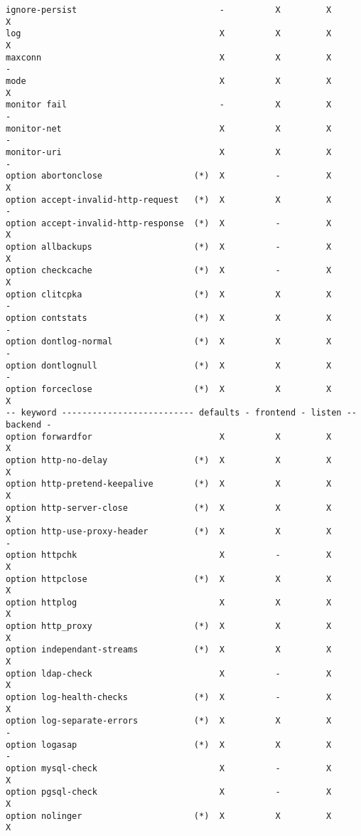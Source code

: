 \begin{verbatim}
ignore-persist                            -          X         X         X
log                                       X          X         X         X
maxconn                                   X          X         X         -
mode                                      X          X         X         X
monitor fail                              -          X         X         -
monitor-net                               X          X         X         -
monitor-uri                               X          X         X         -
option abortonclose                  (*)  X          -         X         X
option accept-invalid-http-request   (*)  X          X         X         -
option accept-invalid-http-response  (*)  X          -         X         X
option allbackups                    (*)  X          -         X         X
option checkcache                    (*)  X          -         X         X
option clitcpka                      (*)  X          X         X         -
option contstats                     (*)  X          X         X         -
option dontlog-normal                (*)  X          X         X         -
option dontlognull                   (*)  X          X         X         -
option forceclose                    (*)  X          X         X         X
-- keyword -------------------------- defaults - frontend - listen -- backend -
option forwardfor                         X          X         X         X
option http-no-delay                 (*)  X          X         X         X
option http-pretend-keepalive        (*)  X          X         X         X
option http-server-close             (*)  X          X         X         X
option http-use-proxy-header         (*)  X          X         X         -
option httpchk                            X          -         X         X
option httpclose                     (*)  X          X         X         X
option httplog                            X          X         X         X
option http_proxy                    (*)  X          X         X         X
option independant-streams           (*)  X          X         X         X
option ldap-check                         X          -         X         X
option log-health-checks             (*)  X          -         X         X
option log-separate-errors           (*)  X          X         X         -
option logasap                       (*)  X          X         X         -
option mysql-check                        X          -         X         X
option pgsql-check                        X          -         X         X
option nolinger                      (*)  X          X         X         X

\end{verbatim}
